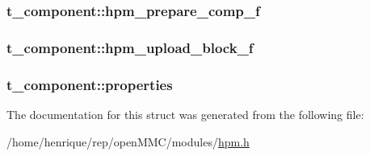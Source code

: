 \hypertarget{structt__component_a3ed3390ba798a04c4819e69ed900ed42}{
\subsubsection[{hpm\-\_\-prepare\-\_\-comp\-\_\-f}]{ t\-\_\-component\-::hpm\-\_\-prepare\-\_\-comp\-\_\-f}}\label{structt__component_a3ed3390ba798a04c4819e69ed900ed42}
\hypertarget{structt__component_a0329631e004cffd84699163d8b9cf39b}{
\subsubsection[{hpm\-\_\-upload\-\_\-block\-\_\-f}]{ t\-\_\-component\-::hpm\-\_\-upload\-\_\-block\-\_\-f}}\label{structt__component_a0329631e004cffd84699163d8b9cf39b}
\hypertarget{structt__component_a4a9dc32ee7875e3d8f17a446120566d6}{
\subsubsection[{properties}]{ t\-\_\-component\-::properties}}\label{structt__component_a4a9dc32ee7875e3d8f17a446120566d6}


The documentation for this struct was generated from the following file\-:\begin{DoxyCompactItemize}
\item 
/home/henrique/rep/open\-M\-M\-C/modules/\hyperlink{hpm_8h}{hpm.\-h}\end{DoxyCompactItemize}
